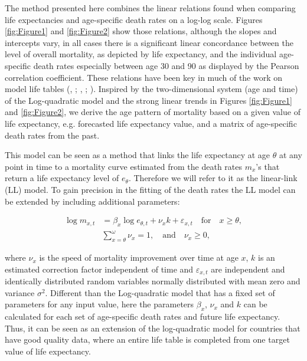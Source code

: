 \documentclass[risks,article,submit,moreauthors,pdftex]{Definitions/mdpi}
\begin{document}
The method presented here combines the linear relations found when comparing life expectancies and age-specific death rates on a log-log scale. Figures \ref{fig:Figure1} and \ref{fig:Figure2} show those relations, although the slopes and intercepts vary, in all cases there is a significant linear concordance between the level of overall mortality, as depicted by life expectancy, and the individual age-specific death rates especially between age 30 and 90 as displayed by the Pearson correlation coefficient. These relations have been key in much of the work on model life tables (\citealp{gabriel1958, UN1955}, \citeyear{UN1967}; \citealp{coale1966}, \citeyear{coale1983};  \citealp{ledermann1969}). Inspired by the two-dimensional system (age and time) of the Log-quadratic model \cite{wilmoth2012} and the strong linear trends in Figures \ref{fig:Figure1} and \ref{fig:Figure2}, we derive the age pattern of mortality based on a given value of life expectancy, e.g. forecasted life expectancy value, and a matrix of age-specific death rates from the past.

This model can be seen as a method that links the life expectancy at age $\theta$ at any point in time to a mortality curve estimated from the death rates $m_x$'s that return a life expectancy level of $e_\theta$. Therefore we will refer to it as the linear-link (LL) model. To gain precision in the fitting of the death rates the LL model can be extended by including additional parameters:

\begin{equation}
 \begin{split}
	\log{m_{x,t}} & = \beta_x\log{e_{\theta,t}} + \nu_xk + \varepsilon_{x,t}
	\quad \textrm{for} \quad  x \geq \theta, \\
	& \sum_{x = \theta}^{\omega} \nu_{x} = 1,
	\quad
	\textrm{and} \quad \nu_{x} \geq 0,
 \end{split}
\end{equation}

where $\nu_{x}$ is the speed of mortality improvement over time at age $x$, $k$ is an estimated correction factor independent of time and $\varepsilon_{x,t}$ are independent and identically distributed random variables normally distributed with mean zero and variance $\sigma^2$. Different than the Log-quadratic model that has a fixed set of parameters for any input value, here the parameters $\beta_x$, $\nu_x$ and $k$ can be calculated for each set of age-specific death rates and future life expectancy. Thus, it can be seen as an extension of the log-quadratic model for countries that have good quality data, where an entire life table is completed from one target value of life expectancy.
\end{document}
